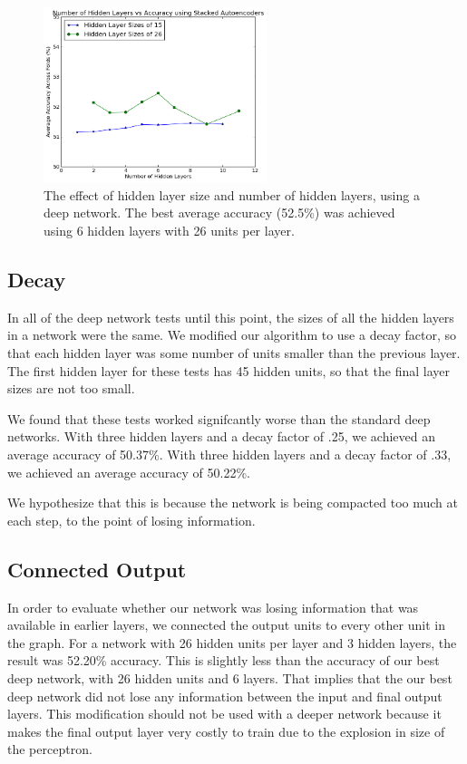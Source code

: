 \documentclass[letterpaper,twocolumn,12pt]{article}
\begin{document}
\begin{figure}[ht!]
\centering
\includegraphics[width=65mm]{results/deep/numLayers/deep_numLayers.png}
\caption{The effect of hidden layer size and number of hidden layers, using a deep network. The best average accuracy (52.5\%) was achieved using 6 hidden layers with 26 units per layer.}
\label{fig:deep_num_hidden_layers}
\end{figure}

\subsection{Decay}
In all of the deep network tests until this point, the sizes of all the hidden layers in a network were the same.
We modified our algorithm to use a decay factor, so that each hidden layer was some number of units smaller than the previous layer.
The first hidden layer for these tests has 45 hidden units, so that the final layer sizes are not too small.

We found that these tests worked signifcantly worse than the standard deep networks.
With three hidden layers and a decay factor of .25, we achieved an average accuracy of 50.37\%.
With three hidden layers and a decay factor of .33, we achieved an average accuracy of 50.22\%.

We hypothesize that this is because the network is being compacted too much at each step, to the point of losing information.

\subsection{Connected Output}
In order to evaluate whether our network was losing information that was available in earlier layers, we connected the output units to every other unit in the graph.
For a network with 26 hidden units per layer and 3 hidden layers, the result was 52.20\% accuracy.
This is slightly less than the accuracy of our best deep network, with 26 hidden units and 6 layers.
That implies that the our best deep network did not lose any information between the input and final output layers.
This modification should not be used with a deeper network because it makes the final output layer very costly to train due to the explosion in size of the perceptron.
\end{document}
